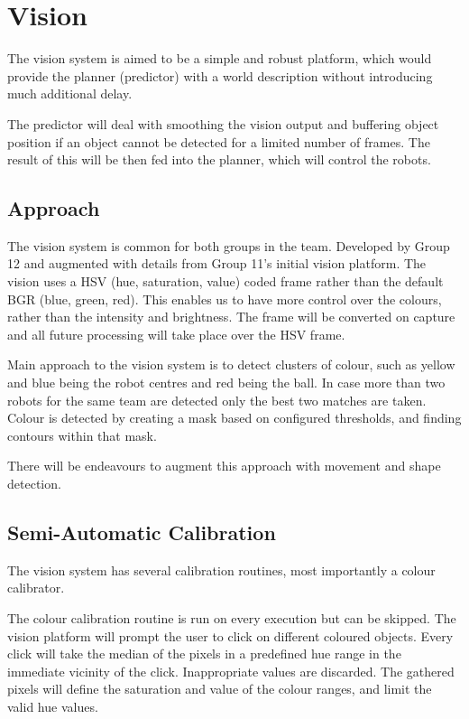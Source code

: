 \section{Vision}

The vision system is aimed to be a simple and robust platform, which would provide the planner (predictor) with a world description without introducing much additional delay.

The predictor will deal with smoothing the vision output and buffering object position if an object cannot be detected for a limited number of frames. The result of this will be then fed into the planner, which will control the robots.

\subsection{Approach}
The vision system is common for both groups in the team. Developed by Group 12 and augmented with details from Group 11's initial vision platform. The vision uses a HSV (hue, saturation, value) coded frame rather than the default BGR (blue, green, red). This enables us to have more control over the colours, rather than the intensity and brightness. The frame will be converted on capture and all future processing will take place over the HSV frame.

Main approach to the vision system is to detect clusters of colour, such as yellow and blue being the robot centres and red being the ball. In case more than two robots for the same team are detected only the best two matches are taken. Colour is detected by creating a mask based on configured thresholds, and finding contours within that mask.

There will be endeavours to augment this approach with movement and shape detection.

\subsection{Semi-Automatic Calibration}

The vision system has several calibration routines, most importantly a colour calibrator. 

The colour calibration routine is run on every execution but can be skipped. The vision platform will prompt the user to click on different coloured objects. Every click will take the median of the pixels in a predefined hue range in the immediate vicinity of the click. Inappropriate values are discarded. The gathered pixels will define the saturation and value of the colour ranges, and limit the valid hue values.

